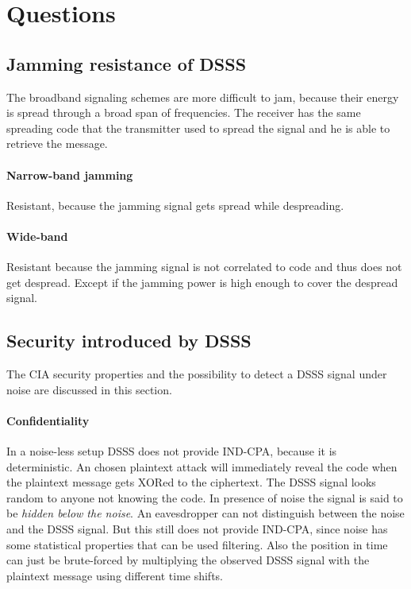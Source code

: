 \documentclass[12pt,a4paper]{article}
\begin{document}
	
	
	\section{Questions}
		
		\subsection{Jamming resistance of DSSS}\label{jamming}
		The broadband signaling schemes are more difficult to jam, because their energy is spread through a broad span of frequencies. The receiver has the same spreading code that the transmitter used to spread the signal and he is able to retrieve the message. 
		
		\paragraph{Narrow-band jamming} Resistant, because the jamming signal gets spread while despreading.
		
		\paragraph{Wide-band} Resistant because the jamming signal is not correlated to code and thus does not get despread. Except if the jamming power is high enough to cover the despread signal.

\subsection{Security introduced by DSSS}
	The CIA security properties and the possibility to detect a DSSS signal under noise are discussed in this section.
		
	\paragraph{Confidentiality}
	In a noise-less setup DSSS does not provide IND-CPA, because it is deterministic. An chosen plaintext attack will immediately reveal the code when the plaintext message gets XORed to the ciphertext.
	The DSSS signal looks random to anyone not knowing the code. In presence of noise the signal is said to be \emph{hidden below the noise}. An eavesdropper can not distinguish between the noise and the DSSS signal.
	But this still does not provide IND-CPA, since noise has some statistical properties that can be used filtering. Also the position in time can just be brute-forced by multiplying the observed DSSS signal with the plaintext message using different time shifts.
	
\end{document}
